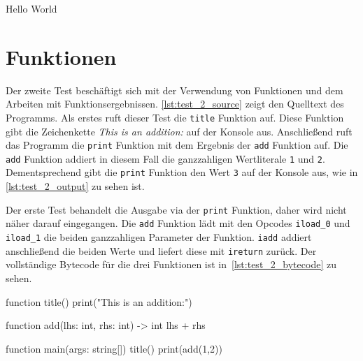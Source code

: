 \begin{ToyaCode}[numbers=none, caption={Konsolen-Ausgabe des Hello World Programms},label=lst:test_1_output]
Hello World    
\end{ToyaCode}

\section{Funktionen}

Der zweite Test beschäftigt sich mit der Verwendung von Funktionen und dem Arbeiten mit Funktionsergebnissen. \autoref{lst:test_2_source} zeigt den Quelltext des Programms. Als erstes ruft dieser Test die \texttt{title} Funktion auf. Diese Funktion gibt die Zeichenkette \textit{This is an addition:} auf der Konsole aus. Anschließend ruft das Programm die \texttt{print} Funktion mit dem Ergebnis der \texttt{add} Funktion auf. Die \texttt{add} Funktion addiert in diesem Fall die ganzzahligen Wertliterale \texttt{1} und \texttt{2}. Dementsprechend gibt die \texttt{print} Funktion den Wert \texttt{3} auf der Konsole aus, wie in \autoref{lst:test_2_output} zu sehen ist.

Der erste Test behandelt die Ausgabe via der \texttt{print} Funktion, daher wird nicht näher darauf eingegangen. Die \texttt{add} Funktion lädt mit den Opcodes \texttt{iload\_0} und \texttt{iload\_1} die beiden ganzzahligen Parameter der Funktion. \texttt{iadd} addiert anschließend die beiden Werte und liefert diese mit \texttt{ireturn} zurück. Der vollständige Bytecode für die drei Funktionen ist in~\autoref{lst:test_2_bytecode} zu sehen.

\begin{ToyaCode}[numbers=none, caption={Funktionen},label=lst:test_2_source]
function title() {
    print("This is an addition:")
}

function add(lhs: int, rhs: int) -> int {
    lhs + rhs
}

function main(args: string[]) {
    title()
    print(add(1,2))
}
\end{ToyaCode}  

